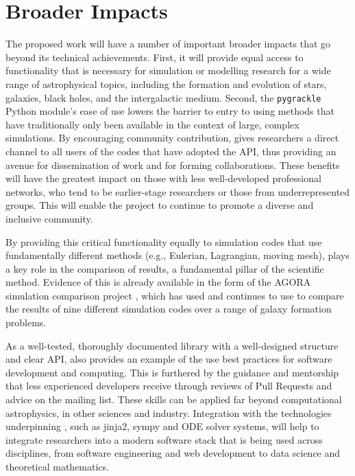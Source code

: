\section{Broader Impacts}

The proposed work will have a number of important broader impacts that go
beyond its technical achievements.  First, it will provide equal
access to functionality that is necessary for simulation or modelling
research for a wide range of astrophysical topics, including the
formation and evolution of stars, galaxies, black holes, and the
intergalactic medium.
Second, the \texttt{pygrackle} Python module's ease of use lowers the
barrier to entry to using methods that have traditionally only been
available in the context of large, complex simulations.  By
encouraging community contribution, \grackle{} gives researchers
a direct channel to all users of the codes that have adopted the
\grackle{} API, thus providing an avenue for dissemination of
work and for forming collaborations.  These benefits will have the
greatest impact on those with less well-developed professional
networks, who tend to be earlier-stage researchers or those from
underrepresented groups.  This will enable the \grackle{} project
to continue to promote a diverse and inclusive community.

By providing this critical functionality equally to simulation codes
that use fundamentally different methods (e.g., Eulerian, Lagrangian,
moving mesh), \grackle{} plays a key role in the comparison of
results, a fundamental pillar of the scientific method.  Evidence of
this is already available in the form of the AGORA simulation
comparison project \citep{2014ApJS..210...14K, 2016ApJ...833..202K},
which has used and continues to use \grackle{} to compare the results
of nine
different simulation codes over a range of galaxy formation problems.

As a well-tested, thoroughly documented library with a well-designed
structure and clear API, \grackle{} also provides an example of the
use best practices for software development and computing.  This is
furthered by the guidance and mentorship that less experienced
developers receive through reviews of Pull Requests and
advice on the mailing list.  These skills can be applied far
beyond computational astrophysics, in other sciences and industry.  Integration
with the technologies underpinning \dengo{}, such as jinja2, sympy and ODE
solver systems, will help to integrate researchers into a modern software stack
that is being used across disciplines, from software engineering and web
development to data science and theoretical mathematics.

